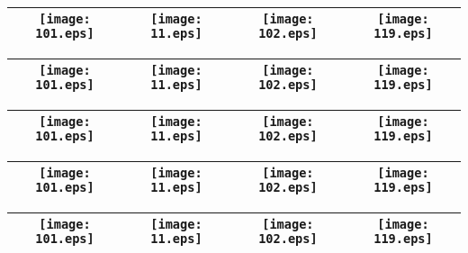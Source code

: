 \begin{table}[ht!]
\centering
{}
\graphicspath{{../../IbexJobs/ibex_lambdas_20191109/Simulations/Simulation_20180302_\arabic{j}/}}
\begin{tabular}{ccccc}
\toprule
\multicolumn{2}{c}{\texttt{[image: 101.eps]}} & \texttt{[image: 11.eps]} & \texttt{[image: 102.eps]} & \texttt{[image: 119.eps]}\\
\bottomrule
\end{tabular}
\graphicspath{{../../IbexJobs/ibex_lambdas_20191109/Simulations/Simulation_20180302_\arabic{j}/}}
\begin{tabular}{ccccc}
\toprule
\multicolumn{2}{c}{\texttt{[image: 101.eps]}} & \texttt{[image: 11.eps]} & \texttt{[image: 102.eps]} & \texttt{[image: 119.eps]}\\
\bottomrule
\end{tabular}
\graphicspath{{../../IbexJobs/ibex_lambdas_20191109/Simulations/Simulation_20180302_\arabic{j}/}}
\begin{tabular}{ccccc}
\toprule
\multicolumn{2}{c}{\texttt{[image: 101.eps]}} & \texttt{[image: 11.eps]} & \texttt{[image: 102.eps]} & \texttt{[image: 119.eps]}\\
\bottomrule
\end{tabular}
\graphicspath{{../../IbexJobs/ibex_lambdas_20191109/Simulations/Simulation_20180302_\arabic{j}/}}
\begin{tabular}{ccccc}
\toprule
\multicolumn{2}{c}{\texttt{[image: 101.eps]}} & \texttt{[image: 11.eps]} & \texttt{[image: 102.eps]} & \texttt{[image: 119.eps]}\\
\bottomrule
\end{tabular}
\graphicspath{{../../IbexJobs/ibex_lambdas_20191109/Simulations/Simulation_20180302_\arabic{j}/}}
\begin{tabular}{ccccc}
\toprule
\multicolumn{2}{c}{\texttt{[image: 101.eps]}} & \texttt{[image: 11.eps]} & \texttt{[image: 102.eps]} & \texttt{[image: 119.eps]}\\
\bottomrule
\end{tabular}
\graphicspath{{../../IbexJobs/ibex_lambdas_20191109/Simulations/Simulation_20180302_\arabic{j}/}}

\end{table}
